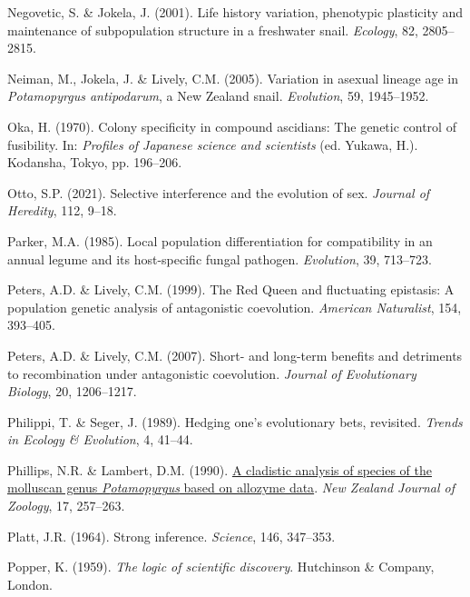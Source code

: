 \documentclass[
  letterpaper,
]{book}
\newlength{\cslhangindent}
\newenvironment{CSLReferences}[2] %
 {\begin{list}{}{%
  \setlength{\itemindent}{0pt}
  \setlength{\leftmargin}{0pt}
  \setlength{\parsep}{0pt}
  \ifodd #1
   \setlength{\leftmargin}{\cslhangindent}
   \setlength{\itemindent}{-1\cslhangindent}
  \fi
  \setlength{\itemsep}{#2\baselineskip}}}
 {\end{list}}
\begin{document}
\begin{CSLReferences}{1}{0}
Negovetic, S. \& Jokela, J. (2001). Life history variation, phenotypic
plasticity and maintenance of subpopulation structure in a freshwater
snail. \emph{Ecology}, 82, 2805--2815.

Neiman, M., Jokela, J. \& Lively, C.M. (2005). Variation in asexual
lineage age in \emph{{P}otamopyrgus antipodarum}, a {New Zealand} snail.
\emph{Evolution}, 59, 1945--1952.

Oka, H. (1970). Colony specificity in compound ascidians: The genetic
control of fusibility. In: \emph{Profiles of {Japanese} science and
scientists} (ed. Yukawa, H.). Kodansha, Tokyo, pp. 196--206.

Otto, S.P. (2021). Selective interference and the evolution of sex.
\emph{Journal of Heredity}, 112, 9--18.

Parker, M.A. (1985). Local population differentiation for compatibility
in an annual legume and its host-specific fungal pathogen.
\emph{Evolution}, 39, 713--723.

Peters, A.D. \& Lively, C.M. (1999). The {Red Queen} and fluctuating
epistasis: A population genetic analysis of antagonistic coevolution.
\emph{American Naturalist}, 154, 393--405.

Peters, A.D. \& Lively, C.M. (2007). Short- and long-term benefits and
detriments to recombination under antagonistic coevolution.
\emph{Journal of Evolutionary Biology}, 20, 1206--1217.

Philippi, T. \& Seger, J. (1989). Hedging one's evolutionary bets,
revisited. \emph{Trends in Ecology \& Evolution}, 4, 41--44.

Phillips, N.R. \& Lambert, D.M. (1990).
\href{https://doi.org/10.1080/03014223.1990.10422600}{A cladistic
analysis of species of the molluscan genus \emph{{P}otamopyrgus} based
on allozyme data}. \emph{New Zealand Journal of Zoology}, 17, 257--263.

Platt, J.R. (1964). Strong inference. \emph{Science}, 146, 347--353.

Popper, K. (1959). \emph{The logic of scientific discovery}. Hutchinson
\& Company, London.


\end{CSLReferences}
\end{document}
